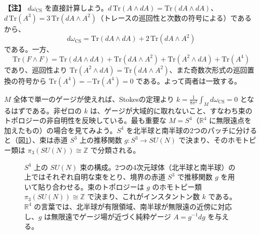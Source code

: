 \documentclass[uplatex, dvipdfmx, book]{jsbook}
\newenvironment{note}{\vspace{1ex}\par\footnotesize\noindent\textbf{【注】}}{\par\vspace{1ex}}
\begin{document}
\begin{note}
$d\omega_{\text{CS}}$ を直接計算しよう。$d\,\mathrm{Tr}(A \wedge dA) = \mathrm{Tr}(dA \wedge dA)$、$d\,\mathrm{Tr}(A^3) = 3\,\mathrm{Tr}(dA \wedge A^2)$（トレースの巡回性と次数の符号による）であるから、
\begin{equation*}
    d\omega_{\text{CS}} = \mathrm{Tr}(dA \wedge dA) + 2\,\mathrm{Tr}(dA \wedge A^2)
\end{equation*}
である。一方、
\begin{equation*}
    \mathrm{Tr}(F \wedge F) = \mathrm{Tr}(dA \wedge dA) + \mathrm{Tr}(dA \wedge A^2) + \mathrm{Tr}(A^2 \wedge dA) + \mathrm{Tr}(A^4)
\end{equation*}
であり、巡回性より $\mathrm{Tr}(A^2 \wedge dA) = \mathrm{Tr}(dA \wedge A^2)$、また奇数次形式の巡回置換の符号から $\mathrm{Tr}(A^4) = -\mathrm{Tr}(A^4) = 0$ である。よって両者は一致する。
\end{note}

$M$ 全体で単一のゲージが使えれば、Stokesの定理より $k = \frac{1}{8\pi^2}\int_M d\omega_{\text{CS}} = 0$ となるはずである。非ゼロの $k$ は、ゲージが大域的に取れないこと、すなわち束のトポロジーの非自明性を反映している。最も重要な $M = S^4$（$\mathbb{R}^4$ に無限遠点を加えたもの）の場合を見てみよう。$S^4$ を北半球と南半球の2つのパッチに分けると（図\ref{fig:S4-gluing}）、束は赤道 $S^3$ 上の推移関数 $g: S^3 \to SU(N)$ で決まり、そのホモトピー類は $\pi_3(SU(N)) \cong \mathbb{Z}$ で分類される。

\begin{figure}[htbp]
\centering
{}
\caption{$S^4$ 上の $SU(N)$ 束の構成。2つの4次元球体（北半球と南半球）の上ではそれぞれ自明な束をとり、境界の赤道 $S^3$ で推移関数 $g$ を用いて貼り合わせる。束のトポロジーは $g$ のホモトピー類 $\pi_3(SU(N)) \cong \mathbb{Z}$ で決まり、これがインスタントン数 $k$ である。$\mathbb{R}^4$ の言葉では、北半球が有限領域、南半球が無限遠の近傍に対応し、$g$ は無限遠でゲージ場が近づく純粋ゲージ $A = g^{-1}dg$ を与える。}
\label{fig:S4-gluing}
\end{figure}
\end{document}
